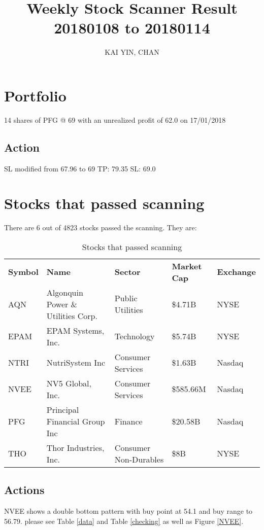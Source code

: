 \documentclass{article}
\begin{document}
\title{Weekly Stock Scanner Result \\ 20180108 to 20180114}
\author{KAI YIN, CHAN}
\maketitle

\section{Portfolio}
14 shares of PFG @ 69 with an unrealized profit of 62.0 on 17/01/2018

\subsection{Action}
SL modified from 67.96 to 69
TP: 79.35 SL: 69.0

\section{Stocks that passed scanning}

There are 6 out of 4823 stocks passed the scanning.  They are:
\begin{table}[htbp]
  \caption{Stocks that passed scanning}
    \begin{tabular}{lllll}
    	\textbf{Symbol} & \textbf{Name} & \textbf{Sector} & \textbf{Market Cap} & \textbf{Exchange} \\
    	AQN   & Algonquin Power \& Utilities Corp. & Public Utilities & \$4.71B & NYSE \\
    	EPAM  & EPAM Systems, Inc. & Technology & \$5.74B & NYSE \\
    	NTRI  & NutriSystem Inc & Consumer Services & \$1.63B & Nasdaq \\
    	NVEE  & NV5 Global, Inc. & Consumer Services & \$585.66M & Nasdaq \\
    	PFG   & Principal Financial Group Inc & Finance & \$20.58B & Nasdaq \\
    	THO   & Thor Industries, Inc. & Consumer Non-Durables & \$8B  & NYSE \\
    \end{tabular}%
    \label{tab:addlabel}%
\end{table}%

\subsection{Actions}
NVEE shows a double bottom pattern with buy point at 54.1 and buy range to 56.79. please see Table \ref{data} and Table \ref{checking} as well as Figure \ref{NVEE}.
\end{document}
